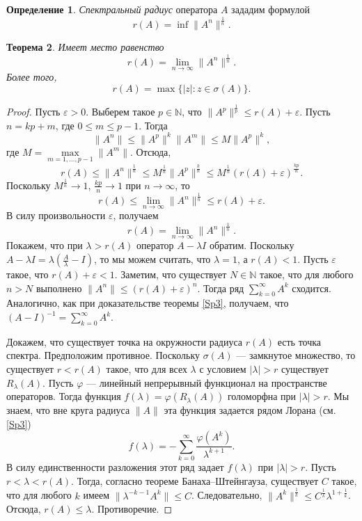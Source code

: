 \documentclass[12pt, titlepage, oneside]{amsbook}
\newcommand{\NN}{\mathbb{N}}
\newtheorem{theorem}{Теорема}[chapter]
\theoremstyle{definition}
\newtheorem{definition}[theorem]{Определение}
\theoremstyle{remark}
\begin{document}
 \begin{definition}
\emph{Спектральный радиус} оператора $A$ зададим формулой $$r(A)=\inf\|A^n\|^{\frac{1}{n}}.$$
\end{definition}

\begin{theorem}
\label{Sp6}
Имеет место равенство
$$r(A)=\lim\limits_{n\rightarrow\infty}\|A^n\|^{\frac{1}{n}}.$$ Более того, $$r(A)=\max\{|z|:z\in\sigma(A)\}.$$
\end{theorem}

\begin{proof}
Пусть $\varepsilon>0$. Выберем такое $p\in\NN$, что $\|A^p\|^{\frac{1}{p}}\leq r(A)+\varepsilon$. Пусть $n=kp+m$, где $0\leq m\leq p-1$. Тогда $$\|A^n\|\leq\|A^p\|^k\|A^m\|\leq M\|A^p\|^k,$$ где $M=\max\limits_{m=1,\ldots,p-1}\|A^m\|$. Отсюда, $$r(A)\leq\|A^n\|^{\frac{1}{n}}\leq M^{\frac{1}{n}}\|A^p\|^{\frac{k}{n}}\leq M^{\frac{1}{n}}(r(A)+\varepsilon)^{\frac{kp}{n}}.$$ Поскольку $M^{\frac{1}{n}}\rightarrow 1$, $\frac{kp}{n}\rightarrow 1$ при $n\rightarrow\infty$, то $$r(A)\leq\lim\limits_{n\rightarrow\infty}\|A^n\|^{\frac{1}{n}}\leq r(A)+\varepsilon.$$ В силу произвольности $\varepsilon$, получаем $$r(A)=\lim\limits_{n\rightarrow\infty}\|A^n\|^{\frac{1}{n}}.$$ Покажем, что при $\lambda>r(A)$ оператор $A-\lambda I$ обратим. Поскольку $A-\lambda I=\lambda(\frac{A}{\lambda}-I)$, то мы можем считать, что $\lambda=1$, а $r(A)<1$. Пусть $\varepsilon$ такое, что $r(A)+\varepsilon<1$. Заметим, что существует $N\in\NN$ такое, что для любого $n>N$ выполнено $\|A^n\|\leq (r(A)+\varepsilon)^n$. Тогда ряд $\sum\limits_{k=0}^{\infty} A^k$ сходится. Аналогично, как при доказательстве теоремы \ref{Sp3}, получаем, что $(A-I)^{-1}=\sum\limits_{k=0}^{\infty} A^k$.

Докажем, что существует точка на окружности радиуса $r(A)$ есть точка спектра. Предположим противное. Поскольку $\sigma(A)$ --- замкнутое множество, то существует $r<r(A)$ такое, что для всех $\lambda$ с условием $|\lambda|>r$ существует $R_{\lambda}(A)$. Пусть $\varphi$ --- линейный непрерывный функционал на пространстве операторов. Тогда функция $f(\lambda)=\varphi(R_{\lambda}(A))$ голоморфна при $|\lambda|>r$. Мы знаем, что вне круга радиуса $\|A\|$ эта функция задается рядом Лорана (см. \ref{Sp3}) $$f(\lambda)=-\sum\limits_{k=0}^{\infty}\frac{\varphi(A^k)}{\lambda^{k+1}}.$$ В силу единственности разложения этот ряд задает $f(\lambda)$ при $|\lambda|>r$. Пусть $r<\lambda<r(A)$. Тогда, согласно теореме Банаха--Штейнгауза, существует $C$ такое, что для любого $k$ имеем $\|\lambda^{-k-1}A^k\|\leq C$. Следовательно, $\|A^k\|^{\frac{1}{k}}\leq C^{\frac{1}{k}}\lambda^{1+\frac{1}{k}}$. Отсюда, $r(A)\leq\lambda$. Противоречие.
\end{proof}
\end{document}
